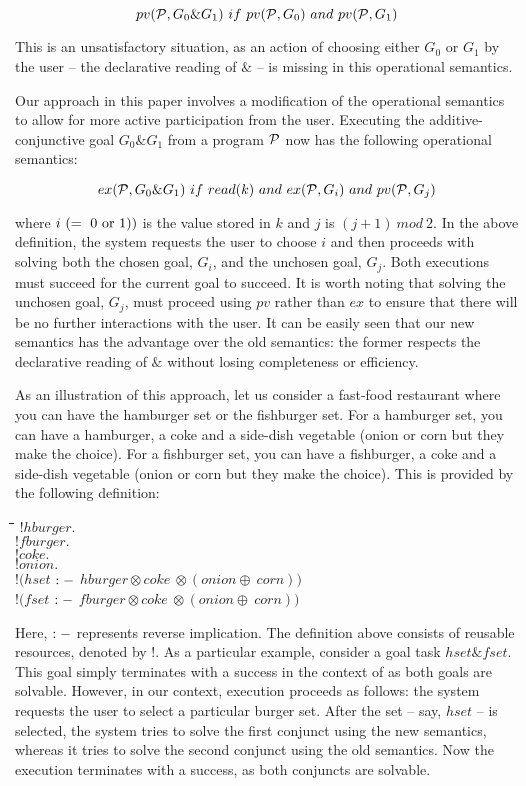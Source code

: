 \documentclass[12pt]{article}
\newcommand{\Pscr}{{\cal P}}
\newenvironment{exmple}{
 \begingroup \begin{tabbing} \hspace{2em}\= \hspace{3em}\= \hspace{3em}\=
\hspace{3em}\= \hspace{3em}\= \hspace{3em}\= \kill}{
 \end{tabbing}\endgroup}
\newcommand{\pr}{prov}
\newcommand{\prove}{exec} \newcommand{\np}{invalid} \newcommand{\Ra}{\supset}
\newcommand{\add}{\oplus} \newcommand{\adc}{\&} \newcommand{\Cscr}{{\cal C}}
\renewcommand{\pr}{pv}
\renewcommand{\prove}{ex}
\begin{document}
\[ \pr(\Pscr, G_0\adc G_1)\ if\ \pr(\Pscr, G_0)\ and\ \pr(\Pscr, G_1) \] 

\noindent
This is an unsatisfactory situation, as  an action of choosing either $G_0$ 
or $G_1$ by the
user --  the declarative reading  of $\adc$ -- is missing in this operational semantics.

 Our approach in this paper involves a modification of the  operational
semantics to allow for more active participation from the user.
Executing the additive-conjunctive goal $G_0 \adc G_1$ from a program $\Pscr$ now  has the
following operational semantics:


\[ \prove(\Pscr, G_0\adc G_1)\ if\ read(k)\ and\ \prove(\Pscr, G_i)\ and\   \pr(\Pscr, G_j) \] 

\noindent where  $i\ (=\ 0\ {\rm or}\ 1))$ is the value stored in $k$ and $j$ is $(j+1)\ mod\ 2$.
In the above definition, the system  requests the user to choose $i$ and then proceeds
with solving both the chosen goal, $G_i$,  and the unchosen goal, $G_j$.
Both executions must succeed for the current goal to succeed.
It is worth noting that
 solving the unchosen goal, $G_j$, must proceed using $\pr$ rather than $\prove$
to ensure that
there will be no further interactions  with the user.
It can be easily seen that our new semantics has the advantage over the old semantics:
the former respects the declarative reading of $\adc$
without losing completeness or efficiency.

As an   
illustration of this approach, let us consider a fast-food restaurant where you can have the
hamburger set or the fishburger set. For a hamburger set, you can have a hamburger, a coke and
a side-dish vegetable (onion or corn but they make the choice).
 For a fishburger set, you can 
have a fishburger, a coke and a side-dish vegetable (onion or corn but they make the choice). 
This is provided by the following definition:

\begin{exmple}
$! hburger.$\\
$! fburger.$\\
$! coke.$\\
$! onion.$\\
$! (hset$ ${\rm :-}$ \> \hspace{2em}      $hburger \otimes coke\ \otimes (onion \add\ corn))$\\ 
$! (fset$ ${\rm :-}$ \> \hspace{2em}      $fburger \otimes coke\ \otimes (onion \add\ corn))$\\
\end{exmple}
\noindent Here, ${\rm :-}$ represents reverse implication.
The  definition above consists of  reusable resources, denoted by $!$.
 As a particular example, consider a goal task $hset \adc fset$. This goal simply terminates
with a success in the context of \cite{HM94} as both goals are solvable.  However, in our context,
  execution proceeds as follows: the system 
 requests the user to select a particular burger set. 
After the set -- 
 say, $hset$ -- is selected, the system tries to solve the first conjunct using the new semantics, whereas it 
tries to solve the second conjunct using the old semantics.
 Now the execution terminates with a success, as both conjuncts are solvable.
\end{document}
